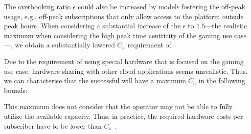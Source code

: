 The overbooking ratio $\epsilon$ could also be increased by models fostering the off-peak usage, e.g., off-peak subscriptions that only allow access to the platform outside peak hours. When considering a substantial increase of the $\epsilon$ to $1.5$---the realistic maximum when considering the high peak time centricity of the gaming use case---, we obtain a substantially lowered $C_{u}$ requirement of 


Due to the requirement of using special hardware that is focused on the gaming use case, hardware sharing with other cloud applications seems unrealistic. Thus, we can characterise that the successful will have a maximum $C_{u}$ in the following bounds:


This maximum does not consider that the operator may not be able to fully utilize the available capacity. Thus, in practice, the required hardware costs per subscriber have to be lower than $C_{u}$ .




